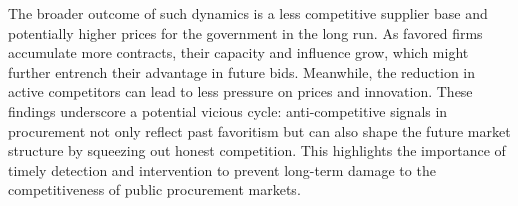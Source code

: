 The broader outcome of such dynamics is a less competitive supplier base and potentially higher prices for the government in the long run. As favored firms accumulate more contracts, their capacity and influence grow, which might further entrench their advantage in future bids. Meanwhile, the reduction in active competitors can lead to less pressure on prices and innovation. These findings underscore a potential vicious cycle: anti-competitive signals in procurement not only reflect past favoritism but can also shape the future market structure by squeezing out honest competition. This highlights the importance of timely detection and intervention to prevent long-term damage to the competitiveness of public procurement markets.
